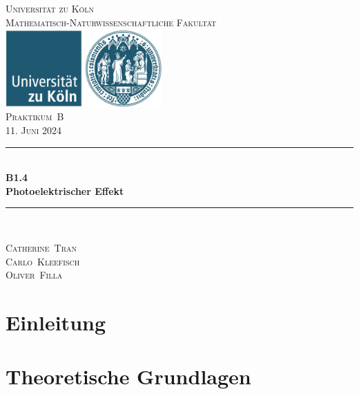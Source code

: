\documentclass[12pt,a4paper]{scrartcl}
\numberwithin{equation}{section} %
\newcommand{\HRule}{\rule{\linewidth}{0.7mm}}
\begin{document}
\begin{titlepage}
	\pagestyle{empty}

	\begin{center}

	\textsc{\LARGE Universität zu Köln }\\ [0.4cm]
	\textsc{Mathematisch-Naturwissenschaftliche Fakultät} \\[1.5cm]

	\includegraphics[width=0.45\textwidth]{../media/uni.jpg} \\[1.5cm]  %

	\textsc{\Large Praktikum~B}\\[2mm]
	\textsc{11. Juni 2024}\\[10mm]
	\HRule \\[0.4cm]

		{	\Huge \bfseries B1.4}\\[0.4cm]
			{	\huge \bfseries Photoelektrischer Effekt}\\[0.3cm]
	
	\HRule \\[3cm]

 	\begin{center}
		\textsc{\Large Catherine~Tran } \\[3pt]
		\textsc{\Large Carlo~Kleefisch } \\[3pt]
		\textsc{\Large Oliver~Filla } \\[3pt]
	\end{center}
	\end{center}
\end{titlepage}

\newpage
\tableofcontents
\newpage

\clearpage
\hypertarget{einleitung}{%
\section{Einleitung}\label{einleitung}}

\clearpage
\hypertarget{theoretische-grundlagen}{%
\section{Theoretische Grundlagen}\label{theoretische-grundlagen}}
\end{document}

